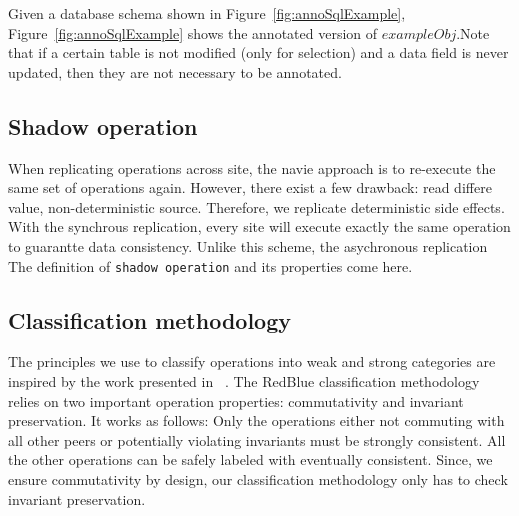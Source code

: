 Given a database schema shown in Figure~\ref{fig:annoSqlExample}, Figure~\ref{fig:annoSqlExample} 
shows the annotated version of $exampleObj$.Note that if a certain table is not 
modified (only for selection) and a data field is never updated, then they are not necessary to be annotated.



\subsection{Shadow operation}
When replicating operations across site, the navie approach is to
re-execute the same set of operations again. However, there exist a
few drawback: read differe value, non-deterministic source. Therefore,
we replicate deterministic side effects.  With the synchrous
replication, every site will execute exactly the same operation to
guarantte data consistency. Unlike this scheme, the asychronous
replication The definition of \texttt{shadow operation} and its
properties come here.


\subsection{Classification methodology}
The principles we use to classify operations into
weak and strong categories are inspired by the work presented in
~\cite{Li2012RedBlue}. The RedBlue classification methodology relies on two important
operation properties: commutativity and invariant preservation. It works as
follows: Only the operations
either not commuting with all other peers or potentially
violating invariants must be strongly consistent. All the other operations
can be safely labeled with eventually consistent. Since, we ensure commutativity
by design, our classification methodology only has to check invariant preservation.

